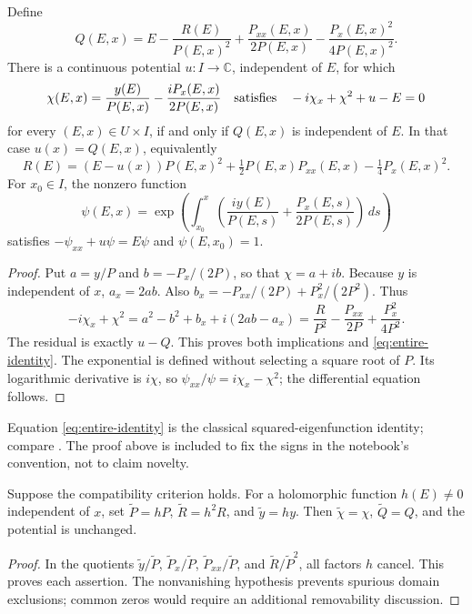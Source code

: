 \begin{proposition}
\label{prop:entire-compatibility}
Define
\[
 Q(E,x)=E-\frac{R(E)}{P(E,x)^2}
       +\frac{P_{xx}(E,x)}{2P(E,x)}
       -\frac{P_x(E,x)^2}{4P(E,x)^2}.
\]
There is a continuous potential \(u:I\to\mathbb C\), independent of \(E\),
for which
\[
 \chi(E,x)=\frac{y(E)}{P(E,x)}-\frac{iP_x(E,x)}{2P(E,x)}
 \quad\hbox{satisfies}\quad
 -i\chi_x+\chi^2+u-E=0
\]
for every \((E,x)\in U\times I\), if and only if \(Q(E,x)\) is independent
of \(E\). In that case \(u(x)=Q(E,x)\), equivalently
\begin{equation}
 R(E)=(E-u(x))P(E,x)^2+\tfrac12P(E,x)P_{xx}(E,x)
                    -\tfrac14P_x(E,x)^2.
 \label{eq:entire-identity}
\end{equation}
For \(x_0\in I\), the nonzero function
\[
 \psi(E,x)=\exp\!\left(\int_{x_0}^{x}
       \left(\frac{i y(E)}{P(E,s)}+\frac{P_x(E,s)}{2P(E,s)}\right)\,ds\right)
\]
satisfies \(-\psi_{xx}+u\psi=E\psi\) and \(\psi(E,x_0)=1\).
\end{proposition}
\begin{proof}
Put \(a=y/P\) and \(b=-P_x/(2P)\), so that \(\chi=a+ib\).
Because \(y\) is independent of \(x\), \(a_x=2ab\). Also
\(b_x=-P_{xx}/(2P)+P_x^2/(2P^2)\). Thus
\[
 -i\chi_x+\chi^2
   =a^2-b^2+b_x+i(2ab-a_x)
   =\frac{R}{P^2}-\frac{P_{xx}}{2P}+\frac{P_x^2}{4P^2}.
\]
The residual is exactly \(u-Q\). This proves both implications and
\eqref{eq:entire-identity}. The exponential is defined without selecting a
square root of \(P\). Its logarithmic derivative is \(i\chi\), so
\(\psi_{xx}/\psi=i\chi_x-\chi^2\); the differential equation follows.
\end{proof}

Equation \eqref{eq:entire-identity} is the classical squared-eigenfunction
identity; compare \citet[Eq.~(2.10)]{gesztesy1999infinite}. The proof above is
included to fix the signs in the notebook's convention, not to claim novelty.

\begin{proposition}
Suppose the compatibility criterion holds. For a holomorphic function
\(h(E)\ne0\) independent of \(x\), set
\(\widetilde P=hP\), \(\widetilde R=h^2R\), and \(\widetilde y=hy\).
Then \(\widetilde\chi=\chi\), \(\widetilde Q=Q\), and the potential is unchanged.
\end{proposition}
\begin{proof}
In the quotients \(\widetilde y/\widetilde P\),
\(\widetilde P_x/\widetilde P\), \(\widetilde P_{xx}/\widetilde P\), and
\(\widetilde R/\widetilde P^2\), all factors \(h\) cancel. This proves each
assertion. The nonvanishing hypothesis prevents spurious domain exclusions;
common zeros would require an additional removability discussion.
\end{proof}

